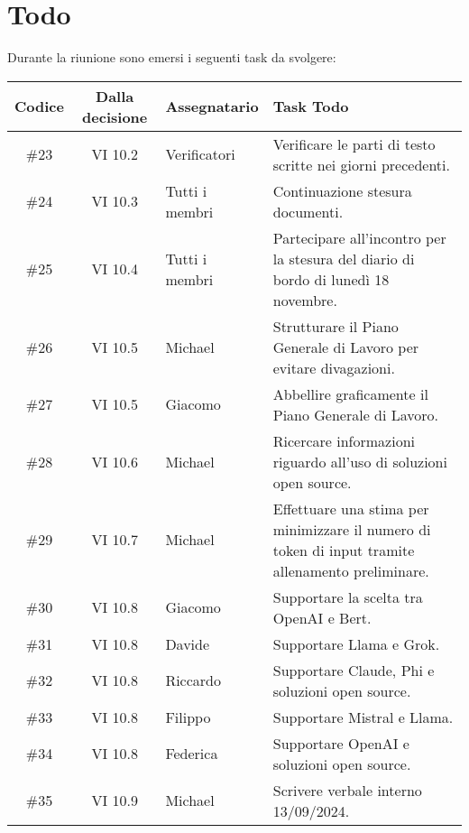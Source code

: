 
\section{Todo}

Durante la riunione sono emersi i seguenti task da svolgere:

\vspace{0.5cm}

\begin{table}[htbp]
\centering
{}
\begin{tabular}{|c|c|p{}|p{}|}
    \hline
    \rowcolor[gray]{0.75}
    \textbf{Codice} & \textbf{Dalla decisione} & \textbf{Assegnatario} & \textbf{Task Todo} \\
    \hline
    \#23 & VI 10.2 & Verificatori & Verificare le parti di testo scritte nei giorni precedenti. \\
    \hline
    \#24 & VI 10.3 & Tutti i membri & Continuazione stesura documenti. \\
    \hline
    \#25 & VI 10.4 & Tutti i membri & Partecipare all'incontro per la stesura del diario di bordo di lunedì 18 novembre. \\
    \hline
    \#26 & VI 10.5 & Michael & Strutturare il Piano Generale di Lavoro per evitare divagazioni. \\
    \hline
    \#27 & VI 10.5 & Giacomo & Abbellire graficamente il Piano Generale di Lavoro. \\
    \hline
    \#28 & VI 10.6 & Michael & Ricercare informazioni riguardo all'uso di soluzioni open source. \\
    \hline
    \#29 & VI 10.7 & Michael & Effettuare una stima per minimizzare il numero di token di input tramite allenamento preliminare. \\
    \hline
    \#30 & VI 10.8 & Giacomo & Supportare la scelta tra OpenAI e Bert. \\
    \hline
    \#31 & VI 10.8 & Davide & Supportare Llama e Grok. \\
    \hline
    \#32 & VI 10.8 & Riccardo & Supportare Claude, Phi e soluzioni open source. \\
    \hline
    \#33 & VI 10.8 & Filippo & Supportare Mistral e Llama. \\
    \hline
    \#34 & VI 10.8 & Federica & Supportare OpenAI e soluzioni open source. \\
    \hline
    \#35 & VI 10.9 & Michael & Scrivere verbale interno 13/09/2024. \\
    \hline
\end{tabular}
\end{table}